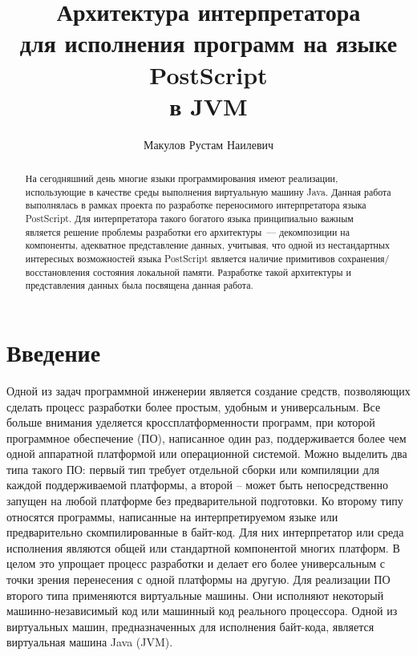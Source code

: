 \title{Архитектура интерпретатора\\ 
для исполнения программ на языке PostScript\\
в JVM}
%
\author{Макулов Рустам Наилевич}
%
%
%

\maketitle              %

\begin{abstract}
На сегодняшний день многие языки программирования имеют реализации, использующие в качестве среды выполнения 
виртуальную машину Java. Данная работа выполнялась в рамках проекта по разработке переносимого интерпретатора языка PostScript. 
Для интерпретатора такого богатого языка принципиально важным является решение проблемы разработки его архитектуры~--- декомпозиции 
на компоненты, адекватное представление данных, учитывая, что одной из нестандартных интересных возможностей языка PostScript 
является наличие примитивов сохранения/восстановления состояния локальной памяти. Разработке такой архитектуры и представления 
данных была посвящена данная работа.
\end{abstract}

\section*{Введение}

Одной из задач программной инженерии является создание средств, позволяющих сделать процесс разработки более простым, удобным и универсальным. Все больше внимания уделяется кроссплатформенности программ, при которой программное обеспечение (ПО), написанное один раз, поддерживается более чем одной аппаратной платформой или операционной системой. Можно выделить два типа такого ПО: первый тип требует отдельной сборки или компиляции для каждой поддерживаемой платформы, а второй – может быть непосредственно запущен на любой платформе без предварительной подготовки. Ко второму типу относятся программы, написанные на интерпретируемом языке или предварительно скомпилированные в байт-код. Для них интерпретатор или среда исполнения являются общей или стандартной компонентой многих платформ. В целом это упрощает процесс разработки и делает его более универсальным с точки зрения перенесения с одной платформы на другую.
Для реализации ПО второго типа применяются виртуальные машины. Они исполняют некоторый машинно-независимый код или машинный код реального процессора. Одной из виртуальных машин, предназначенных для исполнения байт-кода, является виртуальная машина Java (JVM)\cite{jvms}.


